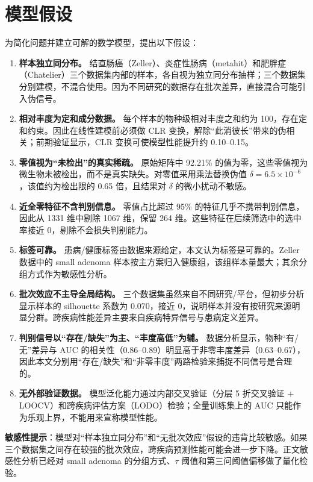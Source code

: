 \section{模型假设}

为简化问题并建立可解的数学模型，提出以下假设：

{\raggedright
\begin{enumerate}
\item \textbf{样本独立同分布。} 结直肠癌（Zeller）、炎症性肠病（metahit）和肥胖症（Chatelier）三个数据集内部的样本，各自视为独立同分布抽样；三个数据集分别建模，不混合使用。因为不同研究的数据存在批次差异，直接混合可能引入伪信号。
\item \textbf{相对丰度为定和成分数据。} 每个样本的物种级相对丰度之和约为 100，存在定和约束。因此在线性建模前必须做 CLR 变换，解除“此消彼长”带来的伪相关；前期验证显示，CLR 变换可使模型性能提升约 0.10--0.15。
\item \textbf{零值视为“未检出”的真实稀疏。} 原始矩阵中 92.21\% 的值为零，这些零值视为微生物未被检出，而不是真实缺失。对零值采用乘法替换伪值 $\delta=6.5\times10^{-6}$，该值约为检出限的 0.65 倍，且结果对 $\delta$ 的微小扰动不敏感。
\item \textbf{近全零特征不含判别信息。} 零值占比超过 95\% 的特征几乎不携带判别信息，因此从 1331 维中剔除 1067 维，保留 264 维。这些特征在后续筛选中的选中率接近 0，剔除不会损失判别能力。
\item \textbf{标签可靠。} 患病/健康标签由数据来源给定，本文认为标签是可靠的。Zeller 数据中的 small adenoma 样本按主方案归入健康组，该组样本量最大；其余分组方式作为敏感性分析。
\item \textbf{批次效应不主导全局结构。} 三个数据集虽然来自不同研究/平台，但初步分析显示样本的 silhouette 系数为 0.070，接近 0，说明样本并没有按研究来源明显分群。跨疾病性能差异主要来自疾病特异信号与患病定义差异。
\item \textbf{判别信号以“存在/缺失”为主、“丰度高低”为辅。} 数据分析显示，物种“有/无”差异与 AUC 的相关性（0.86--0.89）明显高于非零丰度差异（0.63--0.67），因此本文分别用“存在/缺失”和“非零丰度”两路检验来捕捉不同信号是合理的。
\item \textbf{无外部验证数据。} 模型泛化能力通过内部交叉验证（分层 5 折交叉验证 + LOOCV）和跨疾病评估方案（LODO）检验；全量训练集上的 AUC 只能作为乐观上界，不能用来宣称模型性能。
\end{enumerate}
}
\fussy

\noindent\textbf{敏感性提示}：模型对“样本独立同分布”和“无批次效应”假设的违背比较敏感。如果三个数据集之间存在较强的批次效应，跨疾病预测性能可能会进一步下降。正文敏感性分析已经对 small adenoma 的分组方式、$\tau$ 阈值和第三问阈值偏移做了量化检验。

